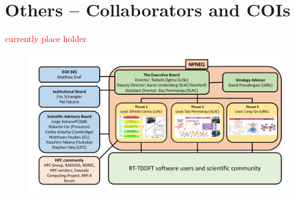 \section{Others -- Collaborators and COIs}
\label{sec:coi}

\textcolor{red}{currently place holder}

\begin{figure}[ht]
    \centering\includegraphics[width=1.0\linewidth]{figures/OrganizationalStructure.pdf}
    
    \label{fig:coi}
\end{figure}

\clearpage